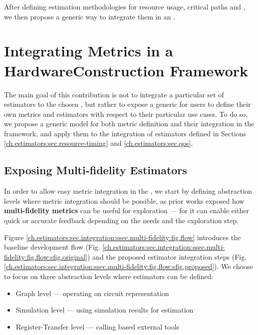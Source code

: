         After defining estimation methodologies for resource usage, critical paths and , we then propose a generic way to integrate them in an .


\section[Integrating Metrics in a HCF]{Integrating Metrics in a Hardware\newline Construction Framework}
\label{ch.estimators:sec.integration}

    The main goal of this contribution is not to integrate a particular set of estimators to the chosen , but rather to expose a generic  for users to define their own metrics and estimators with respect to their particular use cases.
    To do so, we propose a generic model for both metric definition and their integration in the framework, and apply them to the integration of estimators defined in Sections \ref{ch.estimators:sec.resource-timing} and \ref{ch.estimators:sec.qos}.

    \subsection{Exposing Multi-fidelity Estimators}
    \label{ch.estimators:sec.integration:ssec.multi-fidelity}
        In order to allow easy metric integration in the \chisel{} , we start by defining abstraction levels where metric integration should be possible, as prior works exposed how {\bf multi-fidelity metrics} can be useful for exploration \cite{lo_multi-fidelity_2018} --- for it can enable either quick or accurate feedback depending on the needs and the exploration step.
    
        Figure \ref{ch.estimators:sec.integration:ssec.multi-fidelity:fig.flow} introduces the baseline \chisel{} development flow (Fig. \ref{ch.estimators:sec.integration:ssec.multi-fidelity:fig.flow:sfig.original}) and the proposed estimator integration steps (Fig. \ref{ch.estimators:sec.integration:ssec.multi-fidelity:fig.flow:sfig.proposed}).
        We choose to focus on three abstraction levels where estimators can be defined:
        \begin{itemize}
            \item Graph level --- \ie operating on \firrtl{} circuit representation
            \item Simulation level --- \ie using simulation results for estimation
            \item Register-Transfer level --- \ie calling  based external tools
        \end{itemize}

